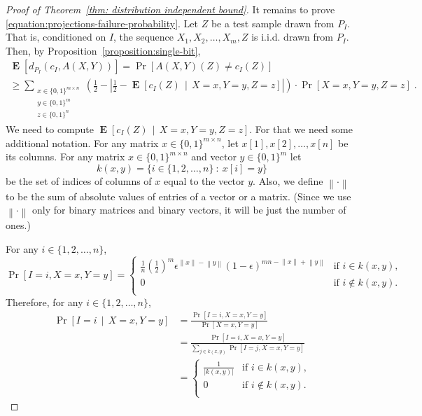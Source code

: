 \documentclass[11pt]{article}
\newcommand{\norm}[1]{\left\| #1 \right\|}
\DeclareMathOperator{\Exp}{\mathbf{E}}
\begin{document}
\begin{proof}[Proof of Theorem~\ref{thm: distribution independent bound}]
It remains to prove \eqref{equation:projections-failure-probability}. Let $Z$ be
a test sample drawn from $P_I$. That is, conditioned on $I$, the sequence $X_1,
X_2, \dots, X_m, Z$ is i.i.d. drawn from $P_I$. Then, by
Proposition~\ref{proposition:single-bit},
\begin{multline}
\label{equation:projections-expected-error-lower-bound}
\Exp \left[d_{P_I}(c_I, A(X,Y))\right]
= \Pr\left[ A(X,Y)(Z) \neq c_I(Z) \right] \\
\ge
\sum_{\substack{x \in \{0,1\}^{m \times n} \\ y \in \{0,1\}^m \\ z \in \{0,1\}^n}} \left( \frac{1}{2} - \left| \frac{1}{2} - \Exp\left[ c_I(Z) \, \middle| \, X = x, Y = y, Z = z \right] \right| \right) \cdot \Pr \left[X = x, Y = y, Z = z \right]  \; .
\end{multline}
We need to compute $\Exp\left[ c_I(Z) \, \middle| \, X = x, Y = y, Z = z \right]$.
For that we need some additional notation.
For any matrix $x \in \{0,1\}^{m \times n}$, let $x[1], x[2], \dots, x[n]$ be its columns.
For any matrix $x \in \{0,1\}^{m \times n}$ and vector $y \in \{0,1\}^m$ let
$$
k(x,y) = \{ i \in \{1,2,\dots,n\} ~:~ x[i] = y \}
$$
be the set of indices of columns of $x$ equal to the vector $y$. Also, we define
$\norm{\cdot}$ to be the sum of absolute values of entries of a vector or a
matrix. (Since we use $\norm{\cdot}$ only for binary matrices and binary
vectors, it will be just the number of ones.)

For any $i \in \{1,2,\dots,n\}$,
$$
\Pr \left[I = i, X = x, Y = y \right]
=
\begin{cases}
\frac{1}{n} \left( \frac{1}{2} \right)^m \epsilon^{\norm{x} - \norm{y}} (1 - \epsilon)^{mn - \norm{x} + \norm{y}} & \text{if $i \in k(x,y)$,} \\
0 & \text{if $i \not \in k(x,y)$.} \\
\end{cases}
$$
Therefore, for any $i \in \{1,2,\dots,n\}$,
\begin{align*}
\Pr \left[I = i \, \middle| \, X = x, Y = y \right]
& = \frac{\Pr \left[I = i, X = x, Y = y \right]}{\Pr \left[ X = x, Y = y \right]} \\
& = \frac{\Pr \left[I = i, X = x, Y = y \right]}{\sum_{j \in k(x,y)} \Pr \left[ I = j, X = x, Y = y \right]} \\
&  =
\begin{cases}
\frac{1}{|k(x,y)|} & \text{if $i \in k(x,y)$,} \\
0 & \text{if $i \not \in k(x,y)$.} \\
\end{cases}
\end{align*}


\end{proof}
\end{document}
